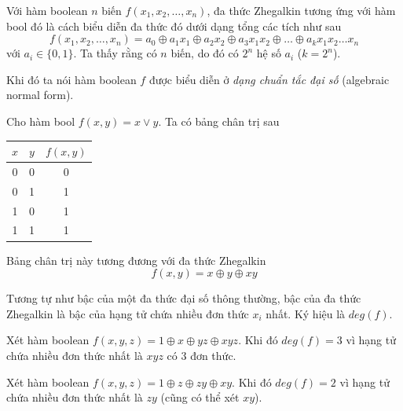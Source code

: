 \begin{definition}
    Với hàm boolean $n$ biến $f(x_1, x_2, \ldots, x_n)$, đa thức Zhegalkin tương ứng với hàm bool đó là cách biểu diễn
    đa thức đó dưới dạng tổng các tích như sau
    \begin{equation}
        f(x_1, x_2, \ldots, x_n) = a_0 \oplus a_1 x_1 
        \oplus a_2 x_2 \oplus a_3 x_1 x_2 \oplus \ldots 
        \oplus a_k x_1 x_2 \ldots x_n
    \end{equation}
    với $a_i \in \{0, 1\}$. Ta thấy rằng có $n$ biến, do đó có 
    $2^n$ hệ số $a_i$ ($k = 2^n$).
\end{definition}

Khi đó ta nói hàm boolean $f$ được biểu diễn ở \textit{dạng
chuẩn tắc đại số} (algebraic normal form).

\begin{example}
    Cho hàm bool $f(x, y) = x \vee y$. Ta có bảng chân trị sau
    \begin{table}[ht]
        \centering
        \begin{tabular}{|c|c|c|}
            \hline
            $x$ & $y$ & $f(x, y)$ \\ \hline
            0 & 0 & 0 \\ \hline
            0 & 1 & 1 \\ \hline
            1 & 0 & 1 \\ \hline
            1 & 1 & 1 \\ \hline
        \end{tabular}
    \end{table}

    Bảng chân trị này tương đương với đa thức Zhegalkin
    \[f(x, y) = x \oplus y \oplus xy\]
\end{example}

\begin{definition}
    Tương tự như bậc của một đa thức đại số thông thường,
    bậc của đa thức Zhegalkin là bậc của hạng tử chứa nhiều
    đơn thức $x_i$ nhất. Ký hiệu là $deg(f)$.
\end{definition}

\begin{example}
    Xét hàm boolean $f(x, y, z) = 1 \oplus x \oplus yz \oplus xyz$.
    Khi đó $deg(f) = 3$ vì hạng tử chứa nhiều đơn thức nhất là $xyz$
    có 3 đơn thức.

    Xét hàm boolean $f(x, y, z) = 1 \oplus z \oplus zy \oplus xy$. 
    Khi đó $deg(f) = 2$ vì hạng tử chứa nhiều đơn thức nhất là
    $zy$ (cũng có thể xét $xy$).
\end{example}

